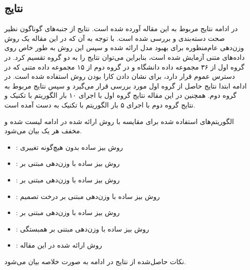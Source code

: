 \documentclass[12pt, a4paper]{article}
\begin{document}
\subsection*{نتایج}

در ادامه نتایج مربوط به این مقاله آورده شده است.
نتایج از جنبه‌های گوناگون نظیر صحت دسته‌بندی و  بررسی شده است.
با توجه به آن که در این مقاله یک روش وزن‌دهی عام‌منظوره برای بهبود مدل
 ارائه شده و سپس این روش به طور خاص روی داده‌های متنی آزمایش
شده است، بنابراین می‌توان نتایج را به دو گروه تقسیم کرد. در گروه اول از ۳۶
مجموعه داده دانشگاه  و در گروه دوم از ۱۵ مجموعه داده
متنی که در دسترس عموم قرار دارد، برای نشان دادن کارا بودن روش استفاده شده است.
در ادامه ابتدا نتایج حاصل از گروه اول مورد بررسی قرار می‌گیرد و سپس
نتایج مربوط به گروه دوم. همچنین در این مقاله نتایج گروه اول با اجرای
۱۰ بار الگوریتم با تکنیک  و نتایج گروه دوم با اجرای ۵ بار الگوریتم
با تکنیک  به دست آمده است.

الگوریتم‌های استفاده شده برای مقایسه با روش ارائه شده در ادامه لیست شده و
مخفف هر یک بیان می‌شود.

\begin{itemize}
    \item {}: روش بیز ساده بدون هیچ‌گونه تغییری
    \item {}: روش بیز ساده با وزن‌دهی مبتنی بر 
    \item {}: روش بیز ساده با وزن‌دهی مبتنی بر 
    \item {}: روش بیز ساده با وزن‌دهی مبتنی بر درخت تصمیم
    \item {}: روش بیز ساده با وزن‌دهی مبتنی بر 
    \item {}: روش بیز ساده با وزن‌دهی مبتنی بر همبستگی
    \item {}: روش ارائه شده در این مقاله
\end{itemize}

نکات حاصل‌شده از نتایج در ادامه به صورت خلاصه بیان می‌شود.
\end{document}
